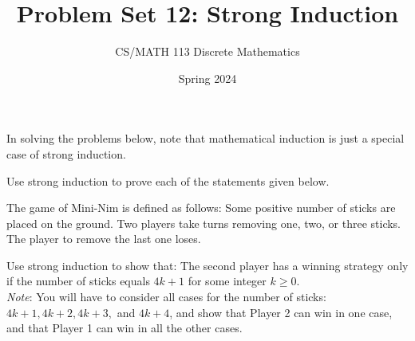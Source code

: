 \documentclass[a4paper]{exam}
\title{Problem Set 12: Strong Induction}
\author{CS/MATH 113 Discrete Mathematics}
\date{Spring 2024}
\newcommand\Z{\ensuremath{\mathbb{Z}}}
\begin{document}
\maketitle

In solving the problems below, note that mathematical induction is just a special case of strong induction.

\begin{questions}

\question Use strong induction to prove each of the statements given below.

\question The game of Mini-Nim is defined as follows: Some positive number of sticks are placed on the ground. Two players take turns removing one, two, or three sticks. The player to remove the last one loses.

  Use strong induction to show that: The second player has a winning strategy only if the number of sticks equals \( 4k + 1 \) for some integer \( k \ge 0 \).\\
  \textit{Note}: You will have to consider all cases for the number of sticks: \( 4k+1, 4k+2, 4k+3, \) and \( 4k+4 \), and show that Player 2 can win in one case, and that Player 1 can win in all the other cases.


\end{questions}
\end{document}

